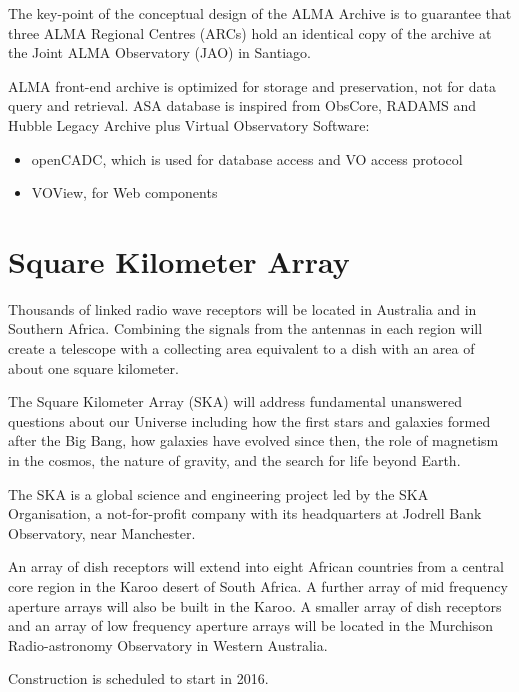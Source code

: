The key-point of the conceptual design of the ALMA Archive is to guarantee that three ALMA Regional Centres (ARCs) hold an identical copy of the archive at the Joint ALMA Observatory (JAO) in Santiago. 

ALMA front-end archive is optimized for storage and preservation, not for data query and retrieval. ASA database is inspired from ObsCore, RADAMS and Hubble Legacy Archive plus Virtual Observatory Software:

\begin{itemize}
\item openCADC, which is used for database access and VO access protocol
\item VOView, for Web components
\end{itemize}




\section{Square Kilometer Array}

Thousands of linked radio wave receptors will be located in Australia and in Southern Africa. Combining the signals from the antennas in each region will create a telescope with a collecting area equivalent to a dish with an area of about one square kilometer.  \newline

The Square Kilometer Array (SKA) will address fundamental unanswered questions about our Universe including how the first stars and galaxies formed after the Big Bang, how galaxies have evolved since then, the role of magnetism in the cosmos, the nature of gravity, and the search for life beyond Earth.  \newline

The SKA is a global science and engineering project led by the SKA Organisation, a not-for-profit company with its headquarters at Jodrell Bank Observatory, near Manchester.  \newline

An array of dish receptors will extend into eight African countries from a central core region in the Karoo desert of South Africa. A further array of mid frequency aperture arrays will also be built in the Karoo. A smaller array of dish receptors and an array of low frequency aperture arrays will be located in the Murchison Radio-astronomy Observatory in Western Australia. \newline

Construction is scheduled to start in 2016.


